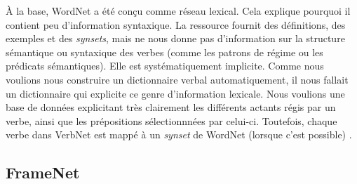 À la base, WordNet a été conçu comme réseau lexical. Cela explique pourquoi il contient peu d'information syntaxique. La ressource fournit des définitions, des exemples et des \emph{synsets}, mais ne nous donne pas d'information sur la structure sémantique ou syntaxique des verbes (comme les patrons de régime ou les prédicats sémantiques). Elle est systématiquement implicite. Comme nous voulions nous construire un dictionnaire verbal automatiquement, il nous fallait un dictionnaire qui explicite ce genre d'information lexicale. Nous voulions une base de données explicitant très clairement les différents actants régis par un verbe, ainsi que les prépositions sélectionnnées par celui-ci. Toutefois, chaque verbe dans VerbNet est mappé à un \emph{synset} de WordNet (lorsque c'est possible) \citep{SchulerVerbnetBroadcoverageComprehensive2005}.


\subsection{FrameNet}

